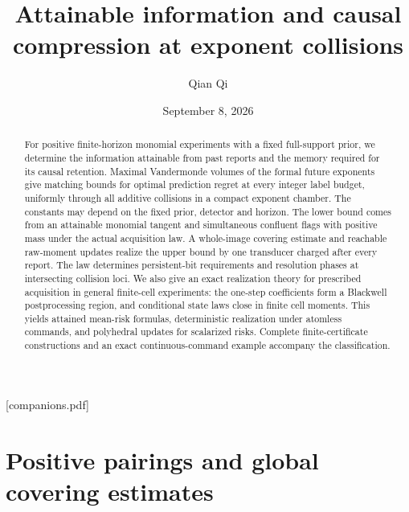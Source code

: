 
\providecommand{\upref}[2]{#1~\ref{#2}}
[companions.pdf]
\title[Attainable information at exponent collisions]{Attainable information and causal compression
at exponent collisions}
\author{Qian Qi}
\date{September 8, 2026}

\begin{abstract}
For positive finite-horizon monomial experiments with a fixed full-support
prior, we determine the information attainable from past reports and the
memory required for its causal retention. Maximal Vandermonde volumes of
the formal future
exponents give matching bounds for optimal prediction regret at every
integer label budget, uniformly through all additive collisions in a
compact exponent chamber. The constants may depend on the fixed prior,
detector and horizon. The lower bound comes from an attainable monomial
tangent and simultaneous confluent flags with positive mass under the
actual acquisition law. A whole-image covering estimate and reachable
raw-moment updates realize the upper bound by one transducer charged
after every report. The law determines persistent-bit requirements and
resolution phases at intersecting collision loci. We also give an exact
realization theory for prescribed acquisition in general finite-cell
experiments: the one-step coefficients form a Blackwell postprocessing
region, and conditional state laws close in finite cell moments.
This yields attained mean-risk formulas, deterministic realization
under atomless commands, and polyhedral updates for scalarized risks.
Complete finite-certificate constructions and an exact continuous-command
example accompany the classification.
\end{abstract}
\maketitle






\section{Positive pairings and global covering estimates}
\label{sec:analytic-inputs}


